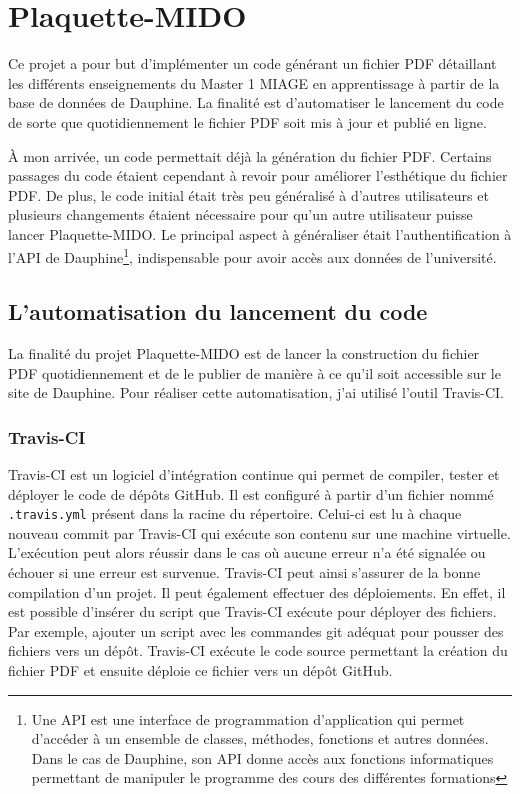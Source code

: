 \chapter[Plaquette-MIDO]{Plaquette-MIDO\raisebox{.3\baselineskip}{\normalsize\footnotemark}}

Ce projet a pour but d'implémenter un code générant un fichier PDF détaillant les différents enseignements du Master 1 MIAGE en apprentissage à partir de la base de données de Dauphine. La finalité est d'automatiser le lancement du code de sorte que quotidiennement le fichier PDF soit mis à jour et publié en ligne.

À mon arrivée, un code permettait déjà la génération du fichier PDF. Certains passages du code étaient cependant à revoir pour améliorer l'esthétique du fichier PDF. De plus, le code initial était très peu généralisé à d'autres utilisateurs et plusieurs changements étaient nécessaire pour qu'un autre utilisateur puisse lancer Plaquette-MIDO. Le principal aspect à généraliser était l'authentification à l'API de Dauphine\footnote{Une API est une interface de programmation d’application qui permet d'accéder à un ensemble de classes, méthodes, fonctions et autres données. Dans le cas de Dauphine, son API donne accès aux fonctions informatiques permettant de manipuler le programme des cours des différentes formations}, indispensable pour avoir accès aux données de l'université.

\section{L'automatisation du lancement du code}
\label{sec:automatisation}

La finalité du projet Plaquette-MIDO est de lancer la construction du fichier PDF quotidiennement et de le publier de manière à ce qu'il soit accessible sur le site de Dauphine. Pour réaliser cette automatisation, j'ai utilisé l'outil Travis-CI.

\subsection{Travis-CI}
    Travis-CI est un logiciel d'intégration continue qui permet de compiler,
    tester et déployer le code de dépôts GitHub. Il est configuré à partir
    d'un fichier nommé \texttt{.travis.yml} présent dans la racine du
    répertoire. Celui-ci est lu à chaque nouveau commit par Travis-CI qui
    exécute son contenu sur une machine virtuelle. L'exécution peut alors
    réussir dans le cas où aucune erreur n'a été signalée ou échouer si une
    erreur est survenue. Travis-CI peut ainsi s'assurer de la bonne
    compilation d'un projet. Il peut également effectuer des déploiements.
    En effet, il est possible d'insérer du script que Travis-CI exécute pour
    déployer des fichiers. Par exemple, ajouter un script avec les commandes
    git adéquat pour pousser des fichiers vers un dépôt. Travis-CI exécute le code source permettant la création du fichier PDF et ensuite
    déploie ce fichier vers un dépôt GitHub.

